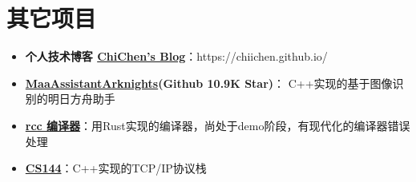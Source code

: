 \documentclass{resume}
\begin{document}






\section{其它项目}
\begin{itemize}[parsep=0.2ex]
  \item \textbf{个人技术博客 \href{https://chiichen.github.io/}{ChiChen's Blog}}：https://chiichen.github.io/
  \item \textbf{\href{https://github.com/MaaAssistantArknights/MaaAssistantArknights}{MaaAssistantArknights}(Github 10.9K Star)}： C++实现的基于图像识别的明日方舟助手
  \item \textbf{\href{https://github.com/RccCommunity/rcc}{rcc 编译器}}：用Rust实现的编译器，尚处于demo阶段，有现代化的编译器错误处理
  \item \textbf{\href{https://github.com/Chiichen/sponge}{CS144}}：C++实现的TCP/IP协议栈
\end{itemize}

%
%
\end{document}
